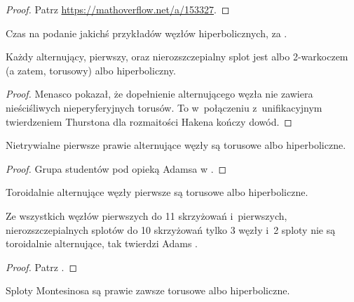 \begin{proof}
    Patrz \url{https://mathoverflow.net/a/153327}.
\end{proof}

Czas na podanie jakichś przykładów węzłów hiperbolicznych, za \cite{adams05}.

\begin{proposition}
    Każdy alternujący, pierwszy, oraz nierozszczepialny splot jest albo 2-warkoczem (a zatem, torusowy) albo hiperboliczny.
\end{proposition}

\begin{proof}
%
    Menasco \cite{menasco84} pokazał, że dopełnienie alternującego węzła nie zawiera nieściśliwych nieperyferyjnych torusów.
    To w~połączeniu z~unifikacyjnym twierdzeniem Thurstona dla rozmaitości Hakena kończy dowód.
%
\end{proof}

\begin{proposition}
    Nietrywialne pierwsze prawie alternujące węzły są torusowe albo hiperboliczne.
\end{proposition}

\begin{proof}
    Grupa studentów pod opieką Adamsa w \cite{brock92}.
\end{proof}

\begin{proposition}
    Toroidalnie alternujące węzły pierwsze są torusowe albo hiperboliczne.
\end{proposition}

Ze wszystkich węzłów pierwszych do 11 skrzyżowań i~pierwszych, nierozszczepialnych splotów do 10 skrzyżowań tylko 3 węzły i~2 sploty nie są toroidalnie alternujące, tak twierdzi Adams \cite{adams05}.

\begin{proof}
    Patrz \cite{adams994}.
\end{proof}

\begin{proposition}
    Sploty Montesinosa są prawie zawsze torusowe albo hiperboliczne.
\end{proposition}

